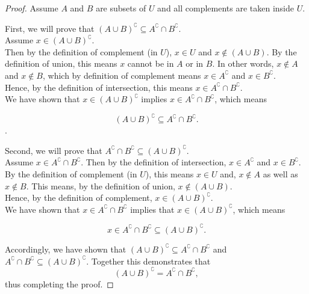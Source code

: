 \documentclass{amsart} %
\theoremstyle{definition} %
\theoremstyle{proposition} %
\theoremstyle{remark} %
\begin{document}
\begin{proof}
      Assume $A$ and $B$ are subsets of $U$ and all complements are taken inside $U$.

      First, we will prove that $(A \cup B)^\complement \subseteq A^\complement \cap B^\complement $. \\
      \indent Assume $x \in (A \cup B)^\complement$. \\
      \indent Then by the definition of complement (in $U$), $x \in U$ and $x \not\in (A \cup B) $. By the definition of union, this means $x$ cannot be in $A$ or in $B$. In other words, $x \not\in A$ and $x \not\in B$, which by definition of complement means $x \in A^\complement$ and $x \in B^\complement$. \\
      \indent Hence, by the definition of intersection, this means $x \in A^\complement \cap B^\complement$. \\
      \indent We have shown that $x \in (A \cup B)^\complement $ implies $x \in A^\complement \cap B^\complement$, which means

      $$(A \cup B)^\complement \subseteq A^\complement \cap B^\complement .$$.

      Second, we will prove that $A^\complement \cap B^\complement \subseteq (A \cup B)^\complement $. \\
      \indent Assume $x \in A^\complement \cap B^\complement$. Then by the definition of intersection, $x \in A^\complement$ and $x \in B^\complement$. \\
      \indent By the definition of complement (in $U$), this means $x \in U$ and, $x \not\in A$ as well as $x \not\in B$. This means, by the definition of union, $x \not\in (A \cup B)$.\\
      \indent Hence, by the definition of complement, $x \in (A \cup B)^\complement$. \\
      \indent We have shown that $x \in A^\complement \cap B^\complement$ implies that $x \in (A \cup B)^\complement$, which means

      $$x \in A^\complement \cap B^\complement \subseteq (A \cup B)^\complement .$$

      Accordingly, we have shown that $(A \cup B)^\complement \subseteq A^\complement \cap B^\complement$ and $A^\complement \cap B^\complement \subseteq (A \cup B)^\complement$. Together this demonstrates that
      $$(A \cup B)^\complement = A^\complement \cap B^\complement ,$$
      thus completing the proof.
\end{proof}
\end{document}

